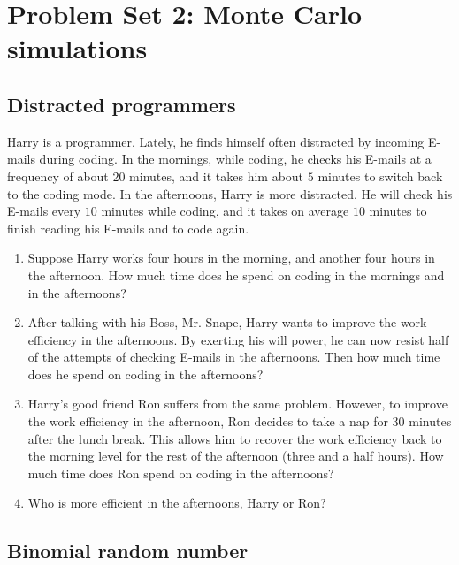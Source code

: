 \documentclass[12pt]{article}
\begin{document}
\section{Problem Set 2: Monte Carlo simulations}


\subsection{Distracted programmers}


Harry is a programmer.
%
Lately, he finds himself often distracted by
incoming E-mails during coding.
%
In the mornings,
while coding,
he checks his E-mails at a frequency of about $20$ minutes,
and it takes him about $5$ minutes to switch back to
the coding mode.
%
In the afternoons, Harry is more distracted.
%
He will check his E-mails every $10$ minutes while coding,
and it takes on average $10$ minutes
to finish reading his E-mails and to code again.

\begin{enumerate}
  \item
    Suppose Harry works four hours in the morning,
    and another four hours in the afternoon.
    How much time does he spend on coding
    in the mornings and in the afternoons?

  \item
    After talking with his Boss, Mr. Snape,
    Harry wants to improve the work efficiency
    in the afternoons.
    By exerting his will power,
    he can now resist half of the attempts of checking E-mails
    in the afternoons.
    Then how much time does he spend on coding
    in the afternoons?

  \item
    Harry's good friend Ron
    suffers from the same problem.
    However,
    to improve the work efficiency in the afternoon,
    Ron decides to take a nap for $30$ minutes
    after the lunch break.
    This allows him to recover the work efficiency
    back to the morning level
    for the rest of the afternoon
    (three and a half hours).
    How much time does Ron spend on coding
    in the afternoons?

  \item
    Who is more efficient in the afternoons, Harry or Ron?
\end{enumerate}




\subsection{Binomial random number}
\end{document}
